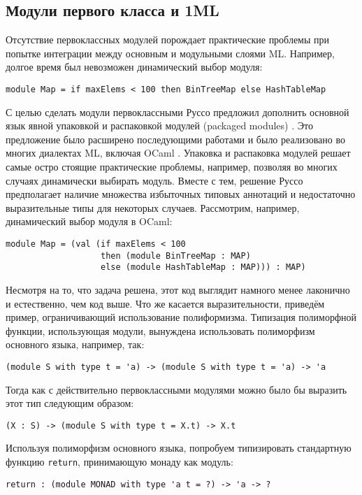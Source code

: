 \documentclass[../diploma.tex]{subfiles}
\begin{document}
 \label{sec:domain_review}

\subsection{Модули первого класса и 1ML}

Отсутствие первоклассных модулей порождает практические проблемы при попытке интеграции между основным и модульными слоями ML. Например, долгое время был невозможен динамический выбор модуля:
\begin{verbatim}
module Map = if maxElems < 100 then BinTreeMap else HashTableMap 
\end{verbatim}

С целью сделать модули первоклассными Руссо предложил дополнить основной язык явной упаковкой и распаковкой модулей (packaged modules) \cite{packaged}. Это предложение было расширено последующими работами и было реализовано во многих диалектах ML, включая OCaml \cite{packaged_ocaml}. Упаковка и распаковка модулей решает самые остро стоящие практические проблемы, например, позволяя во многих случаях динамически выбирать модуль. Вместе с тем, решение Руссо предполагает наличие множества избыточных типовых аннотаций и недостаточно выразительные типы для некоторых случаев. Рассмотрим, например, динамический выбор модуля в OCaml:
\begin{verbatim}
module Map = (val (if maxElems < 100 
                   then (module BinTreeMap : MAP)
                   else (module HashTableMap : MAP))) : MAP)
\end{verbatim}

Несмотря на то, что задача решена, этот код выглядит намного менее лаконично и естественно, чем код выше. Что же касается выразительности, приведём пример, ограничивающий использование полиформизма. Типизация полиморфной функции, использующая модули, вынуждена использовать полиморфизм основного языка, например, так:
\begin{verbatim}
(module S with type t = 'a) -> (module S with type t = 'a) -> 'a
\end{verbatim}

Тогда как с действительно первоклассными модулями можно было бы выразить этот тип следующим образом:
\begin{verbatim}
(X : S) -> (module S with type t = X.t) -> X.t
\end{verbatim}

Используя полиморфизм основного языка, попробуем типизировать стандартную функцию \texttt{return}, принимающую монаду как модуль:
\begin{verbatim}
return : (module MONAD with type 'a t = ?) -> 'a -> ?
\end{verbatim}
\end{document}
